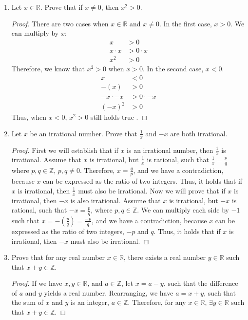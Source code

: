 \documentclass[12pt]{article}
\newcommand{\Z}{\mathbb{Z}}
\newcommand{\R}{\mathbb{R}}
\begin{document}
\begin{enumerate}
\begin{proof}
\end{proof}
\item Let $x\in \R$. Prove that if $x\neq 0$, then $x^2>0$.
\begin{proof} There are two cases when $x\in \R$ and $x\neq 0$. In the first case, $ x > 0$. We can multiply by $x$:
\begin{align*}
x &> 0 \\
x \cdot x &> 0 \cdot x \\
x^2 &> 0
\end{align*}
Therefore, we know that $x^2 > 0$ when $x > 0$. In the second case, $x < 0$.
\begin{align*}
x &< 0 \\
-(x) &> 0 \\
-x \cdot -x &> 0 \cdot -x \\
(-x)^2 &> 0
\end{align*}
Thus, when $x < 0$, $x^2 > 0$ still holds true . 
\end{proof}
\item Let $x$ be an irrational number. Prove that $\frac{1}{x}$ and $-x$ are both irrational.
\begin{proof}
First we will establish that if $x$ is an irrational number, then $\frac{1}{x}$ is irrational. Assume that $x$ is irrational, but $\frac{1}{x}$ is rational, such that $\frac{1}{x} = \frac{p}{q}$ where $p, q \in \Z$, $p, q \neq 0$. Therefore, $x = \frac{q}{p}$, and we have a contradiction, because $x$ can be expressed as the ratio of two integers. Thus, it holds that if $x$ is irrational, then $\frac{1}{x}$ must also be irrational. 
\hfill \break \hfill \break
Now we will prove that if $x$ is irrational, then $-x$ is also irrational. Assume that $x$ is irrational, but $-x$ is rational, such that $-x = \frac{p}{q}$, where $p, q \in \Z$. We can multiply each side by $-1$ such that $x = -(\frac{p}{q}) = \frac{-p}{q}$, and we have a contradiction, because $x$ can be expressed as the ratio of two integers, $-p$ and $q$. Thus, it holds that if $x$ is irrational, then $-x$ must also be irrational. 
\end{proof}

\item Prove that for any real number $x\in \R$, there exists a real number $y\in \R$ such that $x+y\in \Z$.

\begin{proof}
If we have $x, y \in \R$, and $a \in \Z$, let $x = a - y$, such that the difference of $a$ and $y$ yields a real number. Rearranging, we have $a = x + y$, such that the sum of $x$ and $y$ is an integer, $a \in \Z$. Therefore, for any $x \in \R$, $\exists y \in \R$ such that $x + y \in \Z$.
\end{proof}


\end{enumerate}
\end{document}
